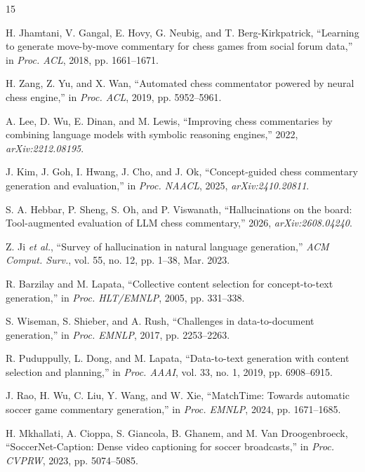 \documentclass[conference]{IEEEtran}
\begin{document}
\begin{thebibliography}{15}

H. Jhamtani, V. Gangal, E. Hovy, G. Neubig, and T. Berg-Kirkpatrick,
``Learning to generate move-by-move commentary for chess games from social
forum data,'' in \emph{Proc. ACL}, 2018, pp. 1661--1671.

H. Zang, Z. Yu, and X. Wan, ``Automated chess commentator powered by neural
chess engine,'' in \emph{Proc. ACL}, 2019, pp. 5952--5961.

A. Lee, D. Wu, E. Dinan, and M. Lewis, ``Improving chess commentaries by
combining language models with symbolic reasoning engines,'' 2022,
\emph{arXiv:2212.08195}.

J. Kim, J. Goh, I. Hwang, J. Cho, and J. Ok, ``Concept-guided chess
commentary generation and evaluation,'' in \emph{Proc. NAACL}, 2025,
\emph{arXiv:2410.20811}.

S. A. Hebbar, P. Sheng, S. Oh, and P. Viswanath, ``Hallucinations on the
board: Tool-augmented evaluation of LLM chess commentary,'' 2026,
\emph{arXiv:2608.04240}.

Z. Ji \emph{et al.}, ``Survey of hallucination in natural language
generation,'' \emph{ACM Comput. Surv.}, vol. 55, no. 12, pp. 1--38, Mar.
2023.

R. Barzilay and M. Lapata, ``Collective content selection for
concept-to-text generation,'' in \emph{Proc. HLT/EMNLP}, 2005, pp. 331--338.

S. Wiseman, S. Shieber, and A. Rush, ``Challenges in data-to-document
generation,'' in \emph{Proc. EMNLP}, 2017, pp. 2253--2263.

R. Puduppully, L. Dong, and M. Lapata, ``Data-to-text generation with
content selection and planning,'' in \emph{Proc. AAAI}, vol. 33, no. 1,
2019, pp. 6908--6915.

J. Rao, H. Wu, C. Liu, Y. Wang, and W. Xie, ``MatchTime: Towards automatic
soccer game commentary generation,'' in \emph{Proc. EMNLP}, 2024,
pp. 1671--1685.

H. Mkhallati, A. Cioppa, S. Giancola, B. Ghanem, and M. Van Droogenbroeck,
``SoccerNet-Caption: Dense video captioning for soccer broadcasts,'' in
\emph{Proc. CVPRW}, 2023, pp. 5074--5085.


\end{thebibliography}
\end{document}
